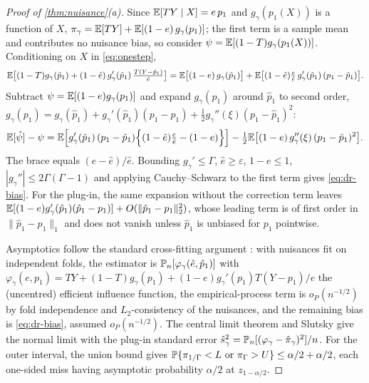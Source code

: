 \begin{proof}[Proof of \cref{thm:nuisance}(a)]
Since $\mathbb{E}[TY\mid X]=e\,p_1$ and $g_\gamma(p_1(X))$ is a function of $X$,
$\pi_\gamma=\mathbb{E}[TY]+\mathbb{E}[(1-e)\,g_\gamma(p_1)]$; the first term is a sample mean
and contributes no nuisance bias, so consider
$\psi=\mathbb{E}[(1-T)g_\gamma(p_1(X))]$. Conditioning on $X$ in \eqref{eq:onestep},
\[
  \mathbb{E}\big[(1-T)g_\gamma(\hat p_1)+(1-\hat e)\,g_\gamma'(\hat p_1)\,
  \tfrac{T(Y-\hat p_1)}{\hat e}\big]
  = \mathbb{E}\big[(1-e)\,g_\gamma(\hat p_1)\big]
  + \mathbb{E}\big[(1-\hat e)\tfrac{e}{\hat e}\,g_\gamma'(\hat p_1)\,(p_1-\hat p_1)\big].
\]
Subtract $\psi=\mathbb{E}[(1-e)g_\gamma(p_1)]$ and expand $g_\gamma(p_1)$ around
$\hat p_1$ to second order,
$g_\gamma(p_1)=g_\gamma(\hat p_1)+g_\gamma'(\hat p_1)(p_1-\hat p_1)
+\tfrac12 g_\gamma''(\xi)(p_1-\hat p_1)^2$:
\[
  \mathbb{E}[\hat\psi]-\psi
  = \mathbb{E}\Big[g_\gamma'(\hat p_1)\,(p_1-\hat p_1)\Big\{(1-\hat e)\tfrac{e}{\hat e}-(1-e)\Big\}\Big]
  - \tfrac12\mathbb{E}\big[(1-e)\,g_\gamma''(\xi)\,(p_1-\hat p_1)^2\big].
\]
The brace equals $(e-\hat e)/\hat e$. Bounding $g_\gamma'\le\Gamma$,
$\hat e\ge\varepsilon$, $1-e\le1$, $|g_\gamma''|\le2\Gamma(\Gamma-1)$ and
applying Cauchy--Schwarz to the first term gives \eqref{eq:dr-bias}. For the
plug-in, the same expansion without the correction term leaves
$\mathbb{E}[(1-e)g_\gamma'(\hat p_1)(\hat p_1-p_1)]+O(\|\hat p_1-p_1\|_2^2)$, whose
leading term is of first order in $\|\hat p_1-p_1\|_1$ and does not vanish
unless $\hat p_1$ is unbiased for $p_1$ pointwise.

Asymptotics follow the standard cross-fitting argument
\citep{chernozhukov2018double}: with nuisances fit on independent folds, the
estimator is $\mathbb{P}_n[\varphi_\gamma(\hat e,\hat p_1)]$ with
$\varphi_\gamma(e,p_1)=TY+(1-T)g_\gamma(p_1)+(1-e)g_\gamma'(p_1)T(Y-p_1)/e$
the (uncentred) efficient influence function, the empirical-process term is
$o_P(n^{-1/2})$ by fold independence and $L_2$-consistency of the nuisances,
and the remaining bias is \eqref{eq:dr-bias}, assumed $o_P(n^{-1/2})$. The
central limit theorem and Slutsky give the normal limit with the plug-in
standard error $\hat s_\gamma^2=\mathbb{P}_n[(\varphi_\gamma-\hat\pi_\gamma)^2]/n$.
For the outer interval, the union bound gives
$\Prb\{\pi_{1/\Gamma}<L\ \text{or}\ \pi_\Gamma>U\}\le\alpha/2+\alpha/2$,
each one-sided miss having asymptotic probability $\alpha/2$ at
$z_{1-\alpha/2}$.
\end{proof}


